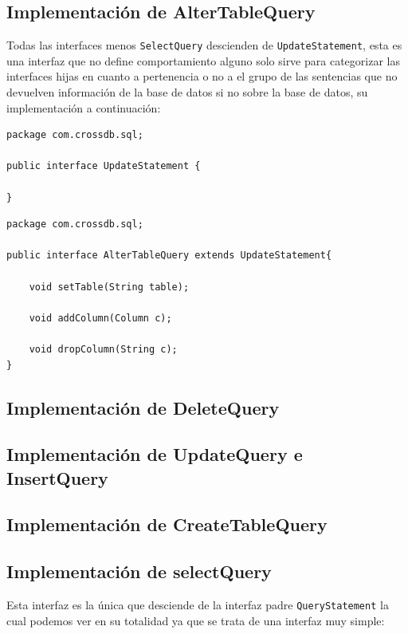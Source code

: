 \subsection{Implementación de AlterTableQuery}
Todas las interfaces menos \verb=SelectQuery= descienden de \verb=UpdateStatement=, esta es una interfaz que no define comportamiento alguno solo sirve para categorizar las interfaces hijas en cuanto a pertenencia o no a el grupo de las sentencias que no devuelven información de la base de datos si no sobre la base de datos, su implementación a continuación:

\begin{lstlisting}[title=interfaz UpdateStatement]
package com.crossdb.sql;

public interface UpdateStatement {

}
\end{lstlisting}

\begin{lstlisting}[title=interfaz AlterTableQuery]
package com.crossdb.sql;

public interface AlterTableQuery extends UpdateStatement{
	
	void setTable(String table);
	
	void addColumn(Column c);
	
	void dropColumn(String c);
}
\end{lstlisting}


\subsection{Implementación de DeleteQuery}




\subsection{Implementación de UpdateQuery e InsertQuery}




\subsection{Implementación de CreateTableQuery}




\subsection{Implementación de selectQuery}

Esta interfaz es la única que desciende de la interfaz padre \verb=QueryStatement= la cual podemos ver en su totalidad ya que se trata de una interfaz muy simple:

